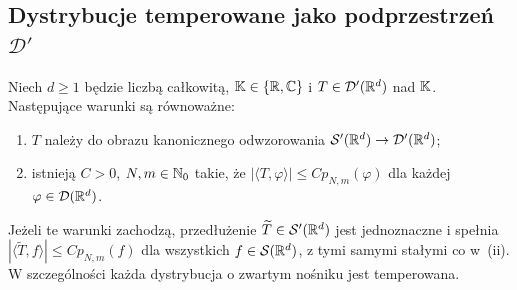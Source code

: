 \subsection{Dystrybucje temperowane jako podprzestrzeń \texorpdfstring{$\mathcal D'$}{D'}}

\begin{twierdzenie}
\label{thm:temp-criterion25}
Niech $d\ge1$ będzie liczbą całkowitą, $\mathbb K\in\{\mathbb R,\mathbb C\}$
i $T\in\mathcal D'(\mathbb R^d)$ nad $\mathbb K$.
Następujące warunki są równoważne:
\begin{enumerate}[label=\textup{(\roman*)}]
\item $T$ należy do obrazu kanonicznego odwzorowania
$\mathcal S'(\mathbb R^d)\to\mathcal D'(\mathbb R^d)$;
\item istnieją $C>0$, $N,m\in\mathbb N_0$ takie, że
$|\langle T,\varphi\rangle|\le C p_{N,m}(\varphi)$
dla każdej $\varphi\in\mathcal D(\mathbb R^d)$.
\end{enumerate}
Jeżeli te warunki zachodzą, przedłużenie
$\widetilde T\in\mathcal S'(\mathbb R^d)$ jest jednoznaczne
i spełnia $|\langle\widetilde T,f\rangle|\le C p_{N,m}(f)$
dla wszystkich $f\in\mathcal S(\mathbb R^d)$, z tymi samymi
stałymi co w~\textup{(ii)}. W szczególności każda
dystrybucja o zwartym nośniku jest temperowana.
\end{twierdzenie}
